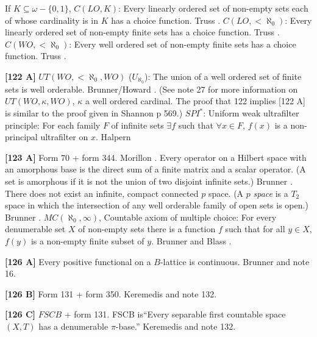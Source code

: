 \medskip
{} If $K\subseteq\omega-\{0,1\}$, $C(LO,K)$:
Every linearly ordered set of non-empty sets each of whose cardinality
is in $K$ has a choice function.  \ac{Truss} \cite{1973a}.
\medskip
{} $C(LO,<\aleph_{0})$: Every linearly ordered set of
non-empty finite sets has a choice function.  \ac{Truss} \cite{1973a}.
\medskip
{} $C(WO,<\aleph_{0})$: Every well ordered set of
non-empty finite sets has a choice function.  \ac{Truss} \cite{1973a}.
\smallskip
\item{}{\bf [122 A]} $UT(WO,<\aleph_{0},WO)$ ($U_{\aleph_{0}}$): The
union of a well ordered set of finite sets is well orderable.
\ac{Brunner/Howard} \cite{1992}. (See note 27 for more information on
$UT(WO,\kappa ,WO)$, $\kappa$ a well ordered cardinal. The proof that
122 implies [122 A] is similar to the proof given in
\ac{Shannon} \cite{1988} p 569.)
\medskip
{} $SPI^*$: Uniform weak ultrafilter principle: For
each family $F$ of infinite sets $\exists f$ such that $\forall x\in F$,
$f(x)$ is a non-principal ultrafilter on $x$. \ac{Halpern} \cite{1972}
\smallskip
\item{}{\bf [123 A]} Form 70 + form 344.  \ac{Morillon} \cite{1988}.
\medskip
{} Every operator on a Hilbert space with an
amorphous base is the direct sum of a finite matrix and  a  scalar
operator.  (A set is amorphous if it is not the union of two disjoint
infinite sets.)  \ac{Brunner} \cite{1984a}.
\medskip
{} There does not exist an infinite, compact connected
$p$ space. (A $p$ {\it space} is a $T_2$ space in which the intersection of
any well orderable family of open sets is open.) \ac{Brunner} \cite{1984c}.
\medskip
{} $MC(\aleph_0,\infty)$, Countable axiom of
multiple choice: For every denumerable set $X$ of non-empty sets there
is a function $f$ such that for all $y\in X$, $f(y)$ is a non-empty finite
subset of $y$. \ac{Brunner} \cite{1984d} and \ac{Blass} \cite{1979}.
\smallskip
\item{}{\bf [126 A]} Every positive functional on a $B$-lattice is
continuous. \ac{Brunner} \cite{1984d} and note 16.
\smallskip
\item{}{\bf [126 B]} Form 131 + form 350. \ac{Keremedis} \cite{1999a} and
note 132.
\smallskip
\item{}{\bf [126 C]} $FSCB$ + form 131.
FSCB is``Every separable first countable space $(X,T)$ has a
denumerable $\pi$-base.'' \ac{Keremedis} \cite{1999a} and note 132.

